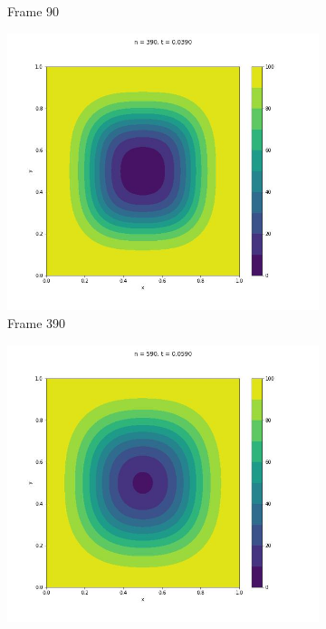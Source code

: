 \documentclass{article}
\begin{document}
\begin{figure} [H]
\begin{subfigure}{0.25\linewidth}
    \caption{Frame 90}
  \end{subfigure}
  \begin{subfigure}{0.25\linewidth}
    \centering
    \includegraphics[width=\linewidth]{Cuadrada/2D/390.jpg}
    \caption{Frame 390}
  \end{subfigure}
    \begin{subfigure}{0.25\linewidth}
    \centering
    \includegraphics[width=\linewidth]{Cuadrada/2D/590.jpg}

\end{subfigure}
\end{figure}
\end{document}
